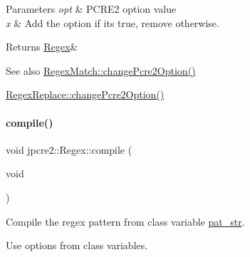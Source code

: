 \begin{DoxyParams}{Parameters}
{\em opt} & P\+C\+R\+E2 option value \\
\hline
{\em x} & Add the option if it\textquotesingle{}s true, remove otherwise. \\
\hline
\end{DoxyParams}
\begin{DoxyReturn}{Returns}
\hyperlink{classjpcre2_1_1Regex}{Regex}\& 
\end{DoxyReturn}
\begin{DoxySeeAlso}{See also}
\hyperlink{classjpcre2_1_1RegexMatch_a6893abc21b24a9d9fca146a33c0f823c_a6893abc21b24a9d9fca146a33c0f823c}{Regex\+Match\+::change\+Pcre2\+Option()} 

\hyperlink{classjpcre2_1_1RegexReplace_aea15c694bba7d994f048596a1f90f71f_aea15c694bba7d994f048596a1f90f71f}{Regex\+Replace\+::change\+Pcre2\+Option()} 
\end{DoxySeeAlso}
\hypertarget{classjpcre2_1_1Regex_aad1d5ef1e87f762f68a587eec4022e69_aad1d5ef1e87f762f68a587eec4022e69}{}\label{classjpcre2_1_1Regex_aad1d5ef1e87f762f68a587eec4022e69_aad1d5ef1e87f762f68a587eec4022e69} 
\paragraph{\texorpdfstring{compile()}{compile()}\hspace{0.1cm}{\footnotesize\ttfamily [1/5]}}
{\footnotesize\ttfamily void jpcre2\+::\+Regex\+::compile (\begin{DoxyParamCaption}\item[{void}]{ }\end{DoxyParamCaption})}



Compile the regex pattern from class variable \hyperlink{classjpcre2_1_1Regex_a0bceb85b6dbba355b56b5cc312214435}{pat\+\_\+str}. 

Use options from class variables.

